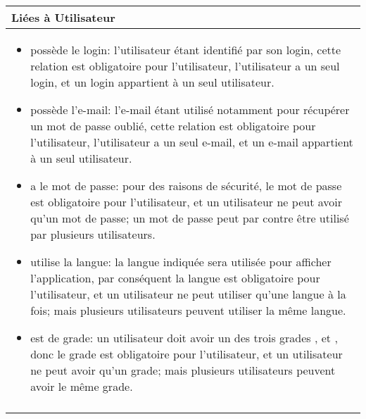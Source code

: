 \documentclass[a4paper,10pt]{article}
\begin{document}
\begin{tabu}{X}
\textbf{Liées à Utilisateur}\\
\toprule

\begin{itemize}
    \item possède le login: l'utilisateur étant identifié par son login, cette relation est obligatoire pour l'utilisateur, l'utilisateur a un seul login, et un login appartient à un seul utilisateur.
    \item possède l'e-mail: l'e-mail étant utilisé notamment pour récupérer un mot de passe oublié, cette relation est obligatoire pour l'utilisateur, l'utilisateur a un seul e-mail, et un e-mail appartient à un seul utilisateur.
    \item a le mot de passe: pour des raisons de sécurité, le mot de passe est obligatoire pour l'utilisateur, et un utilisateur ne peut avoir qu'un mot de passe; un mot de passe peut par contre être utilisé par plusieurs utilisateurs.
    \item utilise la langue: la langue indiquée sera utilisée pour afficher l'application, par conséquent la langue est obligatoire pour l'utilisateur, et un utilisateur ne peut utiliser qu'une langue à la fois; mais plusieurs utilisateurs peuvent utiliser la même langue.
    \item est de grade: un utilisateur doit avoir un des trois grades ,  et , donc le grade est obligatoire pour l'utilisateur, et un utilisateur ne peut avoir qu'un grade; mais plusieurs utilisateurs peuvent avoir le même grade.
\end{itemize}
\\\\
\end{tabu}
\end{document}

